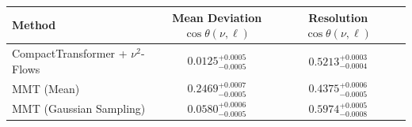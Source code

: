     \begin{tabular}{lccc}
        \toprule
        Method & Mean Deviation $\cos\theta(\nu, \ell)$ & Resolution $\cos\theta(\nu, \ell)$ \\
        \midrule
        CompactTransformer + $\nu^2$-Flows & $0.0125^{+0.0005}_{-0.0005}$ & $0.5213^{+0.0003}_{-0.0004}$ \\
        MMT (Mean) & $0.2469^{+0.0007}_{-0.0005}$ & $0.4375^{+0.0006}_{-0.0005}$ \\
        MMT (Gaussian Sampling) & $0.0580^{+0.0006}_{-0.0005}$ & $0.5974^{+0.0005}_{-0.0008}$ \\
        \bottomrule
    \end{tabular}